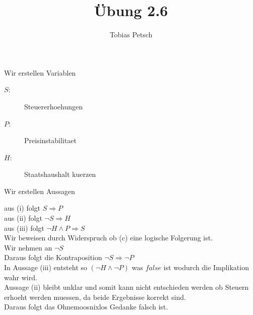 \documentclass[a4paper,12pt]{article}
\title{Übung 2.6}
\author{Tobias Petsch}
\date{}
\begin{document}
\maketitle

Wir erstellen Variablen
\begin{description}
    \item[$S$: ] Steuererhoehungen
    \item[$P$: ] Preisinstabilitaet
    \item[$H$: ] Staatshaushalt kuerzen
\end{description}


Wir erstellen Aussagen

aus (i) folgt $S \Rightarrow P$ \\
aus (ii) folgt $\neg S \Rightarrow H$ \\ 
aus (iii) folgt $\neg H \land P \Rightarrow S$ \\

Wir beweisen durch Widerspruch ob (c) eine logische Folgerung ist. \\
Wir nehmen an $\neg S$ \\
Daraus folgt die Kontraposition $\neg S \Rightarrow \neg P$ \\
In Aussage (iii) entsteht so $(\neg H \land \neg P)$ was $false$ ist wodurch die Implikation wahr wird. \\
Aussage (ii) bleibt unklar und somit kann nicht entschieden werden ob Steuern erhoeht werden muessen, da beide Ergebnisse korrekt sind. \\
Daraus folgt das Ohnemoosnixlos Gedanke falsch ist. 

\end{document}
